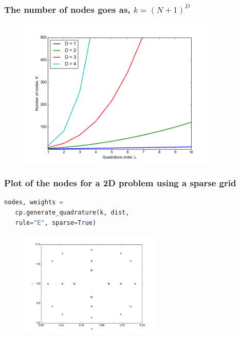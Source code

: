\documentclass{beamer}
\begin{document}
\begin{frame}
 \frametitle{The number of nodes goes as, $k = (N+1)^D$}
 \begin{figure}
  \includegraphics[width=0.85\textwidth]{dimensionality_nodes.png}
 \end{figure}
\end{frame}

\begin{frame}[fragile]
 \frametitle{Plot of the nodes for a 2D problem using a sparse grid}
 \begin{lstlisting}[language=python]
  nodes, weights = 
   cp.generate_quadrature(k, dist, 
   rule="E", sparse=True)
 \end{lstlisting}

 \pause
 \begin{figure}
  \includegraphics[width=0.6\textwidth]{nodes_sparse.png}
 \end{figure}
\end{frame}
 
\end{document}
